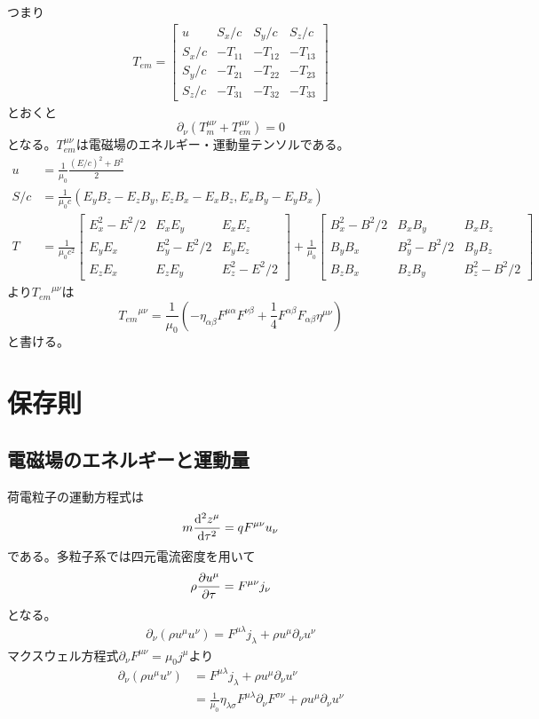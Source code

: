     つまり
    \begin{align*}
        T_{em} = \begin{bmatrix}
            u & S_x/c & S_y/c & S_z/c\\
            S_x/c & -T_{11} & -T_{12} & -T_{13}\\
            S_y/c & -T_{21} & -T_{22} & -T_{23}\\
            S_z/c & -T_{31} & -T_{32} & -T_{33}
        \end{bmatrix}
    \end{align*}
    とおくと
        \[\partial_\nu(T_m^{\mu\nu} + T_{em}^{\mu\nu}) = 0\]
    となる。$T_{em}^{\mu\nu}$は電磁場のエネルギー・運動量テンソルである。
    \begin{align*}
        u &= \frac{1}{\mu_0}\frac{(E/c)^2 + B^2}{2}\\
        S/c &= \frac{1}{\mu_0 c}(E_yB_z - E_zB_y, E_zB_x - E_xB_z, E_xB_y - E_yB_x)\\
        T &= \frac{1}{\mu_0 c^2} \begin{bmatrix}
            E_x^2 - E^2/2 & E_xE_y & E_xE_z\\
            E_yE_x & E_y^2 - E^2/2 & E_yE_z\\
            E_zE_x & E_zE_y & E_z^2 - E^2/2
        \end{bmatrix}
        +
        \frac{1}{\mu_0} \begin{bmatrix}
            B_x^2 - B^2/2 & B_xB_y & B_xB_z\\
            B_yB_x & B_y^2 - B^2/2 & B_yB_z\\
            B_zB_x & B_zB_y & B_z^2 - B^2/2
        \end{bmatrix}
    \end{align*}
    より${T_{em}}^{\mu\nu}$は
        \[{T_{em}}^{\mu\nu} = \frac{1}{\mu_0}\left(-\eta_{\alpha\beta}F^{\mu\alpha}F^{\nu\beta} + \frac{1}{4}F^{\alpha\beta}F_{\alpha\beta}\eta^{\mu\nu}\right)\]
    と書ける。

\section{保存則}
\subsection{電磁場のエネルギーと運動量}
    荷電粒子の運動方程式は
        \[m \dv[2]{z^\mu}{\tau} = q F^{\mu\nu} u_\nu\]
    である。多粒子系では四元電流密度を用いて
        \[\rho\pdv{u^\mu}{\tau} = F^{\mu\nu}j_\nu\]
    となる。
    \begin{align*}
        \partial_\nu(\rho u^\mu u^\nu) = F^{\mu\lambda}j_\lambda + \rho u^\mu \partial_\nu u^\nu
    \end{align*}
    マクスウェル方程式$\partial_\nu F^{\mu\nu} = \mu_0 j^\mu$より
    \begin{align*}
        \partial_\nu(\rho u^\mu u^\nu)
            &= F^{\mu\lambda}j_\lambda + \rho u^\mu \partial_\nu u^\nu\\
            &= \frac{1}{\mu_0} \eta_{\lambda\sigma} F^{\mu\lambda}\partial_\nu F^{\sigma\nu} + \rho u^\mu \partial_\nu u^\nu\\
    \end{align*}
    
